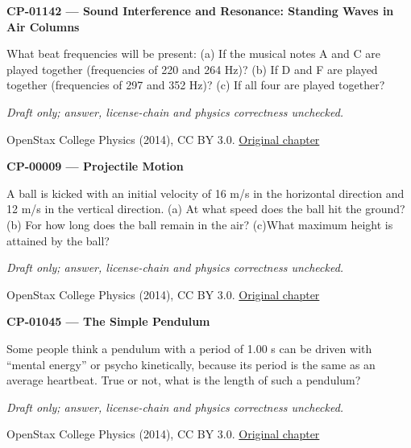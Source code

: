 \par\medskip
\noindent\textbf{CP-01142 — Sound Interference and Resonance: Standing Waves in Air Columns}
\par What beat frequencies will be present: (a) If the musical notes A and C are played together (frequencies of 220 and 264 Hz)? (b) If D and F are played together (frequencies of 297 and 352 Hz)? (c) If all four are played together?
\par\smallskip
\textit{Draft only; answer, license-chain and physics correctness unchecked.}
\par{\footnotesize OpenStax College Physics (2014), CC BY 3.0. \href{https://github.com/philschatz/physics-book/blob/a7efaa7e221fab1694022d8bb98b83a73ee31d3d/contents/m42296.md}{Original chapter}}\par\normalsize

\par\medskip
\noindent\textbf{CP-00009 — Projectile Motion}
\par A ball is kicked with an initial velocity of 16 m/s in the horizontal direction and 12 m/s in the vertical direction. (a) At what speed does the ball hit the ground? (b) For how long does the ball remain in the air? (c)What maximum height is attained by the ball?
\par\smallskip
\textit{Draft only; answer, license-chain and physics correctness unchecked.}
\par{\footnotesize OpenStax College Physics (2014), CC BY 3.0. \href{https://github.com/philschatz/physics-book/blob/a7efaa7e221fab1694022d8bb98b83a73ee31d3d/contents/m42042.md}{Original chapter}}\par\normalsize

\par\medskip
\noindent\textbf{CP-01045 — The Simple Pendulum}
\par Some people think a pendulum with a period of 1.00 s can be driven with “mental energy” or psycho kinetically, because its period is the same as an average heartbeat. True or not, what is the length of such a pendulum?
\par\smallskip
\textit{Draft only; answer, license-chain and physics correctness unchecked.}
\par{\footnotesize OpenStax College Physics (2014), CC BY 3.0. \href{https://github.com/philschatz/physics-book/blob/a7efaa7e221fab1694022d8bb98b83a73ee31d3d/contents/m42243.md}{Original chapter}}\par\normalsize

